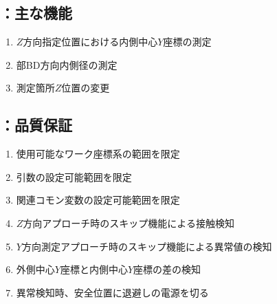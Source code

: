 \subsection{\MYIWidth：主な機能}
\begin{enumerate}[label*=\sarrow]
\item $Z$方向指定位置における内側中心$Y$座標の測定
\item \EndFace 部BD方向内側径の測定
\item 測定箇所$Z$位置の変更
\end{enumerate}


\clearpage
\subsection{\MYIWidth：品質保証}
\begin{enumerate}[label*=\sarrow]
\item 使用可能なワーク座標系の範囲を限定
\item {}引数の設定可能範囲を限定
\item 関連コモン変数の設定可能範囲を限定
\item $Z$方向アプローチ時のスキップ機能による接触検知
\item $Y$方向測定アプローチ時のスキップ機能による異常値の検知
\item 外側中心$Y$座標と内側中心$Y$座標の差の検知
\item 異常検知時、安全位置に退避し\TouchSensorProbe の電源を切る
\end{enumerate}



\clearpage


